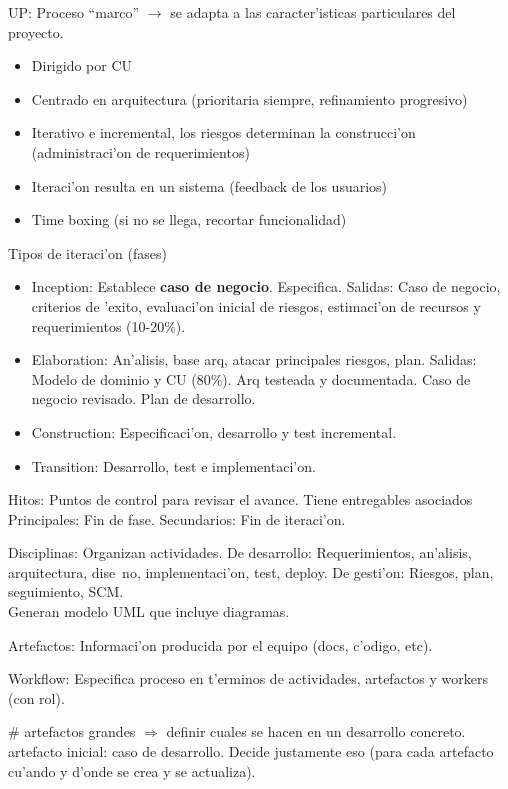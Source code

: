 \documentclass[a4paper,spanish]{article}
\newcommand{\tab}[0]{\hspace*{0.5cm}}
\begin{document}
UP: Proceso ``marco'' $\rightarrow$ se adapta a las caracter'isticas 
	particulares del proyecto.
\begin{itemize}
\item Dirigido por CU
\item Centrado en arquitectura (prioritaria siempre, refinamiento progresivo)
\item Iterativo e incremental, los riesgos determinan la construcci'on 
	(administraci'on de requerimientos)
\item Iteraci'on resulta en un sistema (feedback de los usuarios)
\item Time boxing (si no se llega, recortar funcionalidad)
\end{itemize}

Tipos de iteraci'on (fases)
\begin{itemize}
\item Inception: Establece \textbf{caso de negocio}. Especifica. Salidas: Caso
	de negocio, criterios de 'exito, evaluaci'on inicial de riesgos, 
	estimaci'on de recursos y requerimientos (10-20\%).
\item Elaboration: An'alisis, base arq, atacar principales riesgos, plan. 
	Salidas: Modelo de dominio y CU (80\%). Arq testeada y documentada. Caso
	de negocio revisado. Plan de desarrollo.
\item Construction: Especificaci'on, desarrollo y test incremental.
\item Transition: Desarrollo, test e implementaci'on.
\end{itemize}

Hitos: Puntos de control para revisar el avance. Tiene entregables asociados\\
\tab Principales: Fin de fase. Secundarios: Fin de iteraci'on.
 
Disciplinas: Organizan actividades. De desarrollo: Requerimientos, an'alisis,
	arquitectura, dise~no, implementaci'on, test, deploy. De gesti'on: 
	Riesgos, plan, seguimiento, SCM. \\
\tab Generan modelo UML que incluye diagramas.

Artefactos: Informaci'on producida por el equipo (docs, c'odigo, etc).

Workflow: Especifica proceso en t'erminos de actividades, artefactos y 
	workers (con rol).
	
\# artefactos grandes $\Rightarrow$ definir cuales se hacen en un desarrollo
	concreto. \\
\tab artefacto inicial: caso de desarrollo. Decide justamente eso (para cada
	artefacto cu'ando y d'onde se crea y se actualiza).
\end{document}
